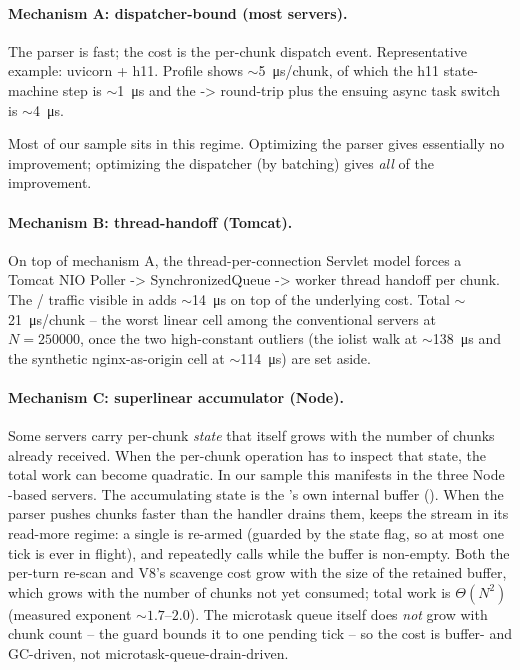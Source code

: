 \paragraph{Mechanism A: dispatcher-bound (most servers).}
The parser is fast; the cost is the per-chunk dispatch event.
Representative example: uvicorn + h11. Profile shows
$\sim$\SI{5}{\micro\second}/chunk, of which the h11 state-machine
step is $\sim$\SI{1}{\micro\second} and the
 ->  round-trip
plus the ensuing async task switch is $\sim$\SI{4}{\micro\second}.

Most of our sample sits in this regime. Optimizing the parser
gives essentially no improvement; optimizing the dispatcher (by
batching) gives \emph{all} of the improvement.

\paragraph{Mechanism B: thread-handoff (Tomcat).}
On top of mechanism A, the thread-per-connection Servlet model
forces a Tomcat NIO Poller -> SynchronizedQueue -> worker thread
handoff per chunk. The
 /  traffic
visible in  adds $\sim$\SI{14}{\micro\second}
on top of the underlying 
cost. Total $\sim$\SI{21}{\micro\second}/chunk -- the worst
linear cell among the conventional servers at $N{=}\num{250000}$,
once the two high-constant outliers (the  iolist walk
at $\sim$\SI{138}{\micro\second} and the synthetic nginx-as-origin
cell at $\sim$\SI{114}{\micro\second}) are set aside.

\paragraph{Mechanism C: superlinear accumulator (Node).}
Some servers carry per-chunk \emph{state} that itself grows with
the number of chunks already received. When the per-chunk
operation has to inspect that state, the total work can become
quadratic. In our sample this manifests in the three Node
-based servers. The accumulating state is the
's own internal buffer
(). When the parser pushes chunks
faster than the handler drains them,  keeps
the stream in its read-more regime: a single
 is re-armed (guarded by
the  state flag, so at most one tick is ever
in flight), and  repeatedly calls
 while the buffer is non-empty. Both the
per-turn  re-scan and V8's scavenge cost grow with
the size of the retained buffer, which grows with the number of
chunks not yet consumed; total work is $\Theta(N^2)$ (measured
exponent $\sim 1.7$--$2.0$). The microtask queue itself does
\emph{not} grow with chunk count -- the 
guard bounds it to one pending tick -- so the cost is buffer- and
GC-driven, not microtask-queue-drain-driven.

